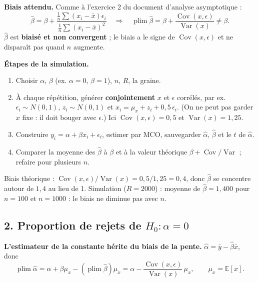 \documentclass[11pt,a4paper]{article}
\newcommand{\E}{\mathbb{E}}\newcommand{\Var}{\operatorname{Var}}\newcommand{\Cov}{\operatorname{Cov}}
\newcommand{\plim}{\operatorname{plim}}
\begin{document}
\textbf{Biais attendu.} Comme à l'exercice 2 du document d'analyse asymptotique :
\[
\hat\beta=\beta+\frac{\frac1n\sum(x_i-\bar x)\epsilon_i}{\frac1n\sum(x_i-\bar x)^2}
\quad\Longrightarrow\quad
\plim\hat\beta=\beta+\frac{\Cov(x,\epsilon)}{\Var(x)}\neq\beta .
\]
$\hat\beta$ est \textbf{biaisé et non convergent} ; le biais a le signe de $\Cov(x,\epsilon)$ et ne disparaît pas quand $n$ augmente.

\textbf{Étapes de la simulation.}
\begin{enumerate}[nosep]
\item Choisir $\alpha$, $\beta$ (ex. $\alpha=0$, $\beta=1$), $n$, $R$, la graine.
\item À chaque répétition, générer \textbf{conjointement} $x$ et $\epsilon$ corrélés, par ex. $\epsilon_i\sim N(0,1)$, $z_i\sim N(0,1)$ et $x_i=\mu_x+z_i+0{,}5\,\epsilon_i$. (On ne peut pas garder $x$ fixe : il doit bouger avec $\epsilon$.) Ici $\Cov(x,\epsilon)=0{,}5$ et $\Var(x)=1{,}25$.
\item Construire $y_i=\alpha+\beta x_i+\epsilon_i$, estimer par MCO, sauvegarder $\hat\alpha$, $\hat\beta$ et le $t$ de $\hat\alpha$.
\item Comparer la moyenne des $\hat\beta$ à $\beta$ et à la valeur théorique $\beta+\Cov/\Var$ ; refaire pour plusieurs $n$.
\end{enumerate}

\begin{reponse}
Biais théorique : $\Cov(x,\epsilon)/\Var(x)=0{,}5/1{,}25=0{,}4$, donc $\hat\beta$ se concentre autour de $1{,}4$ au lieu de 1. Simulation ($R=2000$) : moyenne de $\hat\beta=1{,}400$ pour $n=100$ et $n=1000$ : le biais ne diminue pas avec $n$.
\end{reponse}

\subsection*{2. Proportion de rejets de $H_0:\alpha=0$}

\textbf{L'estimateur de la constante hérite du biais de la pente.} $\hat\alpha=\bar y-\hat\beta\bar x$, donc
\[
\plim\hat\alpha=\alpha+\beta\mu_x-(\plim\hat\beta)\mu_x=\alpha-\frac{\Cov(x,\epsilon)}{\Var(x)}\,\mu_x ,\qquad \mu_x=\E[x].
\]
\end{document}
